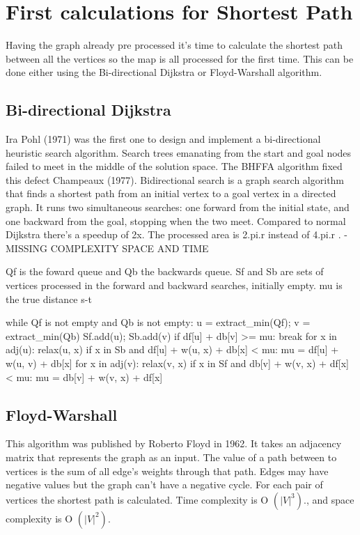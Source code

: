 \section{First calculations for Shortest Path}
Having the graph already pre processed it's time to calculate the shortest path between all the vertices so the map is all processed for the first time. This can be done either using the Bi-directional Dijkstra or Floyd-Warshall algorithm. 

\subsection{Bi-directional Dijkstra}
Ira Pohl (1971) was the first one to design and implement a bi-directional heuristic search algorithm. Search trees emanating from the start and goal nodes failed to meet in the middle of the solution space. The BHFFA algorithm fixed this defect Champeaux (1977).
Bidirectional search is a graph search algorithm that finds a shortest path from an initial vertex to a goal vertex in a directed graph. It runs two simultaneous searches: one forward from the initial state, and one backward from the goal, stopping when the two meet.
Compared to normal Dijkstra there's a speedup of 2x. The processed area is 2.pi.r instead of 4.pi.r .
-MISSING COMPLEXITY SPACE AND TIME

Qf is the foward queue and Qb the backwards queue.
Sf and Sb are sets of vertices processed in the forward and backward searches, initially empty.
mu is the true distance s-t
\begin{algorithm}
while Qf is not empty and Qb is not empty:
    u = extract_min(Qf); v = extract_min(Qb)
    Sf.add(u); Sb.add(v)
    if df[u] + db[v] >= mu:
        break 
    for x in adj(u):
        relax(u, x)
        if x in Sb and df[u] + w(u, x) + db[x] < mu:
            mu = df[u] + w(u, v) + db[x]
    for x in adj(v):
        relax(v, x)
        if x in Sf and db[v] + w(v, x) + df[x] < mu:
            mu = db[v] + w(v, x) + df[x]
\end{algorithm}

\subsection{Floyd-Warshall}
This algorithm was published by Roberto Floyd in 1962.
It takes an adjacency matrix that represents the graph as an input. The value of a path between to vertices is the sum of all edge's weights through that path. Edges may have negative values but the graph can't have a negative cycle.
For each pair of vertices the shortest path is calculated. Time complexity is O \begin{math}(|V| ^3).\end{math}, and space complexity is O \begin{math}(|V| ^2).\end{math}

